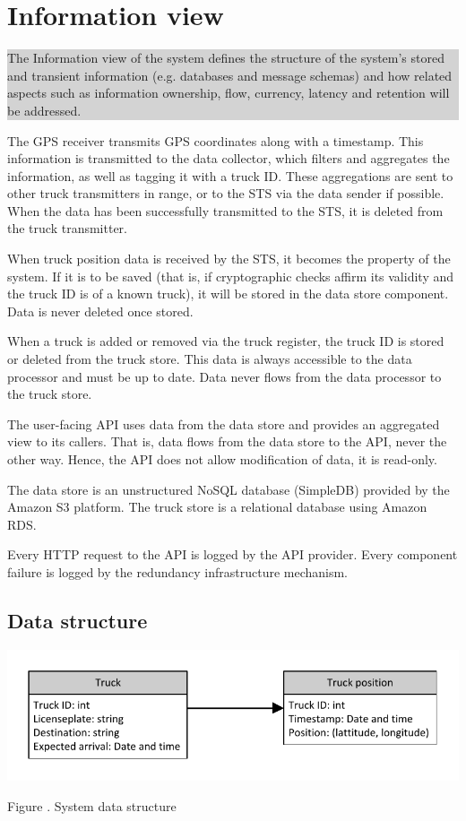\documentclass[a4paper,11pt]{report}
\newcommand{\instructions}[1]{
  \noindent\colorbox{lightgray}{%
    \parbox{\linewidth}{%
      #1
    }%
  }%
 \vspace{0.1cm}
}
\newcommand{\mycaption}[1]{
  \addtocounter{figures}{1}
  Figure \arabic{figures}. #1
}
\begin{document}
\section{Information view}
\label{cha:information-view}

\instructions{
The Information view of the system defines the structure of the
system’s stored and transient information (e.g. databases and message
schemas) and how related aspects such as information ownership, flow,
currency, latency and retention will be addressed.
}

The GPS receiver transmits GPS coordinates along with a timestamp.
This information is transmitted to the data collector, which filters
and aggregates the information, as well as tagging it with a truck ID.
These aggregations are sent to other truck transmitters in range, or
to the STS via the data sender if possible.  When the data has been
successfully transmitted to the STS, it is deleted from the truck
transmitter.

When truck position data is received by the STS, it becomes the
property of the system.  If it is to be saved (that is, if
cryptographic checks affirm its validity and the truck ID is of a
known truck), it will be stored in the data store component.  Data is
never deleted once stored.

When a truck is added or removed via the truck register, the truck ID
is stored or deleted from the truck store.  This data is always
accessible to the data processor and must be up to date.  Data never
flows from the data processor to the truck store.

The user-facing API uses data from the data store and provides an
aggregated view to its callers.  That is, data flows from the data
store to the API, never the other way.  Hence, the API does not allow
modification of data, it is read-only.

The data store is an unstructured NoSQL database (SimpleDB) provided
by the Amazon S3 platform.  The truck store is a relational database
using Amazon RDS.

Every HTTP request to the API is logged by the API provider.  Every
component failure is logged by the redundancy infrastructure
mechanism.

\subsection{Data structure}
\label{sec:data-structure}

\begin{center}
  \includegraphics[width=\textwidth]{figures/Data_structure}\\
  \mycaption{System data structure}
\end{center}
\end{document}
